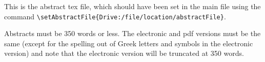 This is the abstract tex file, which should have been set in the main file using the command \verb|\setAbstractFile{Drive:/file/location/abstractFile}|.

Abstracts must be 350 words or less. The electronic and pdf versions must be the same (except for the spelling out of Greek letters and symbols in the electronic version) and note that the electronic version will be truncated at 350 words. 